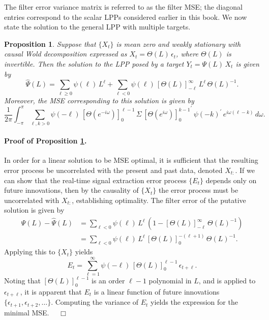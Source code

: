 \documentclass[a4paper]{book}
\newtheorem{Proposition}{Proposition}
\begin{document}
The filter error variance matrix is referred to as the filter MSE;
 the diagonal entries correspond to the scalar LPPs considered
 earlier in this book.   We now state the   solution to the general LPP
 with multiple targets.

\begin{Proposition}
 \label{prop:GPP2}
 Suppose that $\{ X_t \}$ is mean zero and weakly stationary 
 with  causal Wold decomposition expressed as $X_t = \Theta (L) \, \epsilon_t$,
 where $\Theta (L)$ is invertible.    Then the solution
 to the LPP posed by a   target $Y_t = \Psi (L) \, X_t$ is given by
\begin{equation}
 \label{eq:GPPsoln}
 \widehat{\Psi} (L) = \sum_{\ell \geq 0 } \psi (\ell) \, L^{\ell} + 
 \sum_{\ell < 0 } \psi (\ell)
 \,  { [ \Theta (L) ]}_{-\ell}^{ \infty  } \, L^{\ell} \, {\Theta (L) }^{-1}.
\end{equation}
 Moreover, the   MSE  corresponding to this solution is given by
\begin{equation} 
\label{eq:minimalMSE}
 \frac{1}{ 2 \pi} \int_{-\pi}^{\pi}   \sum_{\ell, k > 0 } \psi (-\ell) \,
  {[ \Theta  (e^{-i \omega}) ]}_0^{\ell-1}   \,  \Sigma \,
  { {[ \Theta  (e^{i \omega}) ]}_0^{ k-1} }^{\prime}  \,
   {\psi (-k) }^{\prime} \,  e^{i \omega (\ell - k) }   \, d\omega.
\end{equation}
 \end{Proposition}

  

\paragraph{Proof of Proposition \ref{prop:GPP2}.}
 In order for a linear solution to be MSE optimal, it is sufficient that the
 resulting error process be uncorrelated with the present and past data, denoted $X_{t:}$.
   If we can show that the real-time signal extraction error process $\{ E_t \}$
  depends only on future innovations, then by the causality of $\{ X_t \}$ the error process 
  must be uncorrelated   with $X_{t:}$, establishing optimality.  
 The filter error of the putative solution is  
  given by
\begin{align*}
 \Psi (L) - \widehat{\Psi} (L) & = \sum_{\ell < 0 } \psi (\ell) \, L^{\ell} \,
   \left( 1 -   {[ \Theta (L) ]}_{-\ell}^{\infty} \, { \Theta (L) }^{-1} \right) \\
  & =  \sum_{\ell < 0 } \psi (\ell) \, L^{\ell} \, 
  {[ \Theta (L) ]}_{0}^{ -(\ell + 1)} \, { \Theta (L) }^{-1}.
\end{align*}
 Applying this to $\{ X_t \}$ yields
\[
  E_t = \sum_{\ell =1 }^{\infty} \psi (-\ell) \, {[ \Theta (L) ]}_0^{\ell - 1} \, 
   \epsilon_{t + \ell }.
\]
  Noting that ${[ \Theta (L) ]}_0^{\ell - 1}$ is an order $\ell-1$ polynomial in $L$,
 and is applied to $\epsilon_{t+ \ell}$, it is apparent that $E_t$ is a linear function
 of future innovations $\{ \epsilon_{t+1}, \epsilon_{t+2}, \ldots \}$.  Computing
 the variance of $E_t$ yields the expression for the minimal MSE.  $\quad \Box$
\end{document}
